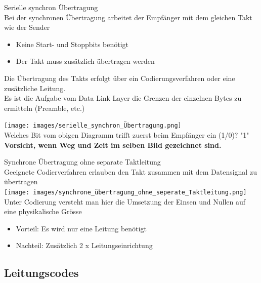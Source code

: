 \begin{definition}{Serielle synchron Übertragung}\\
    Bei der synchronen Übertragung arbeitet der Empfänger mit dem gleichen Takt wie der Sender
    \begin{itemize}
        \item Keine Start- und Stoppbits benötigt
        \item Der Takt muss zusätzlich übertragen werden
    \end{itemize}
    Die Übertragung des Takts erfolgt über ein Codierungsverfahren oder eine zusätzliche Leitung. \\
    Es ist die Aufgabe vom Data Link Layer die Grenzen der einzelnen Bytes zu ermitteln (Preamble, etc.)
\end{definition}

\begin{example}
    \texttt{[image: images/serielle\_synchron\_Übertragung.png]}\\
    Welches Bit vom obigen Diagramm trifft zuerst beim Empfänger ein (1/0)? "1"\\
    \textbf{Vorsicht, wenn Weg und Zeit im selben Bild gezeichnet sind.}
\end{example}

\begin{concept}{Synchrone Übertragung ohne separate Taktleitung}\\
    Geeignete Codierverfahren erlauben den Takt zusammen mit dem Datensignal zu übertragen\\
    \texttt{[image: images/synchrone\_übertragung\_ohne\_seperate\_Taktleitung.png]}\\
    Unter Codierung versteht man hier die Umsetzung der Einsen und Nullen auf eine physikalische Grösse
    \begin{itemize}
        \item Vorteil: Es wird nur eine Leitung benötigt
        \item Nachteil: Zusätzlich 2 x Leitungseinrichtung
    \end{itemize}
\end{concept}


\subsection{Leitungscodes}

